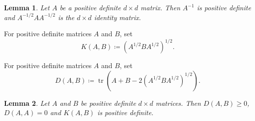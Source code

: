 \documentclass{article}
\newtheorem{lemma}{Lemma}
\begin{document}
\begin{lemma}\label{whitening}
Let $A$ be a positive definite $d\times d$ matrix. Then $A^{-1}$ is positive definite and $A^{-1/2}AA^{-1/2}$ is the $d\times d$ identity matrix.
\end{lemma}

For positive definite matrices $A$ and $B$, set
\[ K(A,B)\coloneqq\left(A^{1/2}BA^{1/2}\right)^{1/2}. \]

For positive definite matrices $A$ and $B$, set
\[ D(A,B)\coloneqq\operatorname{tr}\left(A+B-2\left(A^{1/2}BA^{1/2}\right)^{1/2}\right). \]

\begin{lemma}\label{bures}
Let $A$ and $B$ be positive definite $d\times d$ matrices. Then $D(A,B)\ge0$, $D(A,A)=0$ and $K(A,B)$ is positive definite.
\end{lemma}
\end{document}
